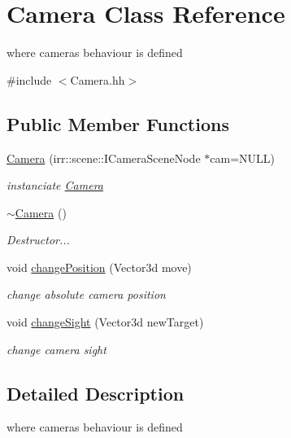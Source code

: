 \hypertarget{classCamera}{}\section{Camera Class Reference}
\label{classCamera}


where cameras behaviour is defined  




{\ttfamily \#include $<$Camera.\+hh$>$}

\subsection*{Public Member Functions}
\begin{DoxyCompactItemize}
\item 
\hyperlink{classCamera_a09f1f6b6619c3d82e9a7f4b6d6942783}{Camera} (irr\+::scene\+::\+I\+Camera\+Scene\+Node $\ast$cam=N\+U\+LL)
\begin{DoxyCompactList}\small\item\em instanciate \hyperlink{classCamera}{Camera} \end{DoxyCompactList}\item 
\mbox{\label{classCamera_ad1897942d0ccf91052386388a497349f}} 
\hyperlink{classCamera_ad1897942d0ccf91052386388a497349f}{$\sim$\+Camera} ()
\begin{DoxyCompactList}\small\item\em Destructor... \end{DoxyCompactList}\item 
void \hyperlink{classCamera_a8d0d954a835c256c3dd6fa627c65b53f}{change\+Position} (Vector3d move)
\begin{DoxyCompactList}\small\item\em change absolute camera position \end{DoxyCompactList}\item 
void \hyperlink{classCamera_ae8cb8b8dd19b4b3a1d4fe64c60615b03}{change\+Sight} (Vector3d new\+Target)
\begin{DoxyCompactList}\small\item\em change camera sight \end{DoxyCompactList}\end{DoxyCompactItemize}


\subsection{Detailed Description}
where cameras behaviour is defined 

